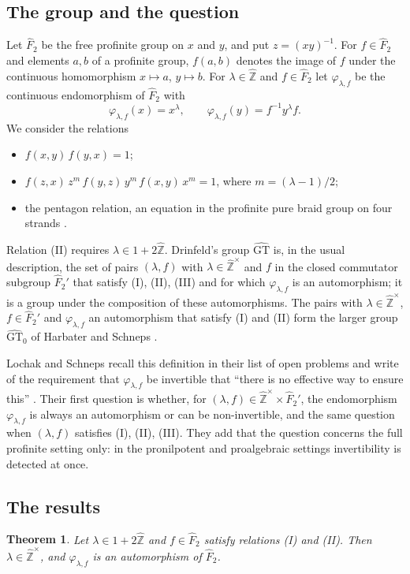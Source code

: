 \documentclass[11pt]{amsart}
\newtheorem{theorem}{Theorem}
\theoremstyle{definition}
\theoremstyle{remark}
\newcommand{\Zh}{\widehat{\mathbb Z}}
\newcommand{\Fh}{\widehat F}
\newcommand{\GT}{\widehat{\mathrm{GT}}}
\newcommand{\GTz}{\widehat{\mathrm{GT}}_0}
\newcommand{\ph}{\varphi}
\begin{document}
\subsection{The group and the question}
Let $\Fh_2$ be the free profinite group on $x$ and $y$, and put $z=(xy)^{-1}$. For $f\in\Fh_2$ and elements $a,b$ of a profinite group, $f(a,b)$ denotes the image of $f$ under the continuous homomorphism $x\mapsto a$, $y\mapsto b$. For $\lambda\in\Zh$ and $f\in\Fh_2$ let $\ph_{\lambda,f}$ be the continuous endomorphism of $\Fh_2$ with
\[
 \ph_{\lambda,f}(x)=x^{\lambda},\qquad \ph_{\lambda,f}(y)=f^{-1}y^{\lambda}f .
\]
We consider the relations
\begin{itemize}
\item[(I)] $f(x,y)\,f(y,x)=1$;
\item[(II)] $f(z,x)\,z^{m}\,f(y,z)\,y^{m}\,f(x,y)\,x^{m}=1$, where $m=(\lambda-1)/2$;
\item[(III)] the pentagon relation, an equation in the profinite pure braid group on four strands \cite[Definition~7.2]{BHR}.
\end{itemize}
Relation (II) requires $\lambda\in1+2\Zh$. Drinfeld's group $\GT$ \cite[\S4]{D} is, in the usual description, the set of pairs $(\lambda,f)$ with $\lambda\in\Zh^\times$ and $f$ in the closed commutator subgroup $\Fh_2'$ that satisfy (I), (II), (III) and for which $\ph_{\lambda,f}$ is an automorphism; it is a group under the composition of these automorphisms. The pairs with $\lambda\in\Zh^\times$, $f\in\Fh_2'$ and $\ph_{\lambda,f}$ an automorphism that satisfy (I) and (II) form the larger group $\GTz$ of Harbater and Schneps \cite{HS}.

Lochak and Schneps recall this definition in their list of open problems and write of the requirement that $\ph_{\lambda,f}$ be invertible that ``there is no effective way to ensure this'' \cite[introduction]{LS}. Their first question \cite[\S1, Question~1.1]{LS} is whether, for $(\lambda,f)\in\Zh^\times\times\Fh_2'$, the endomorphism $\ph_{\lambda,f}$ is always an automorphism or can be non-invertible, and the same question when $(\lambda,f)$ satisfies (I), (II), (III). They add that the question concerns the full profinite setting only: in the pronilpotent and proalgebraic settings invertibility is detected at once.

\subsection{The results}

\begin{theorem}\label{thmA}
Let $\lambda\in1+2\Zh$ and $f\in\Fh_2$ satisfy relations \textup{(I)} and \textup{(II)}. Then $\lambda\in\Zh^\times$, and $\ph_{\lambda,f}$ is an automorphism of $\Fh_2$.
\end{theorem}
\end{document}
